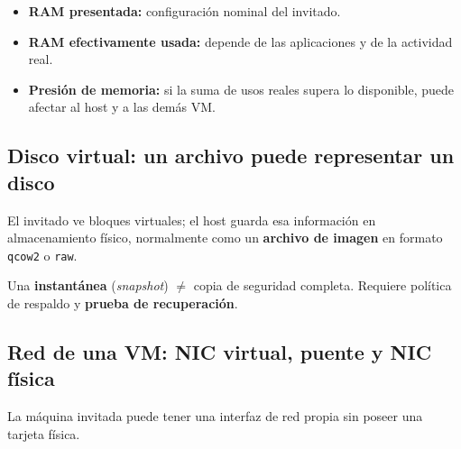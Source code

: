 \documentclass[11pt,a4paper]{article}
\newcommand{\cmd}[1]{\texttt{#1}}
\begin{document}
\begin{itemize}
  \item \textbf{RAM presentada:} configuración nominal del invitado.
  \item \textbf{RAM efectivamente usada:} depende de las aplicaciones y de la actividad real.
  \item \textbf{Presión de memoria:} si la suma de usos reales supera lo disponible,
        puede afectar al host y a las demás VM.
\end{itemize}

\subsection{Disco virtual: un archivo puede representar un disco}

El invitado ve bloques virtuales; el host guarda esa información en almacenamiento físico,
normalmente como un \textbf{archivo de imagen} en formato \cmd{qcow2} o \cmd{raw}.

\begin{center}
\end{center}

\begin{aviso}
Una \textbf{instantánea} (\emph{snapshot}) $\neq$ copia de seguridad completa.
Requiere política de respaldo y \textbf{prueba de recuperación}.
\end{aviso}

\subsection{Red de una VM: NIC virtual, puente y NIC física}

La máquina invitada puede tener una interfaz de red propia sin poseer una tarjeta física.

\begin{center}
\end{center}
\end{document}
